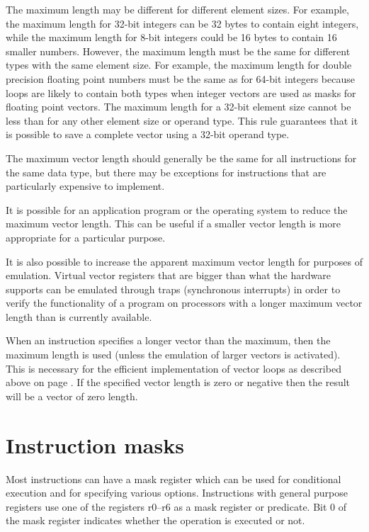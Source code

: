 \documentclass[forwardcom.tex]{subfiles}
\begin{document}
The maximum length may be different for different element sizes. For example, the maximum length for 32-bit integers can be 32 bytes to contain eight integers, while the maximum length for 8-bit integers could be 16 bytes to contain 16 smaller numbers. However, the maximum length must be the same for different types with the same element size. For example, the maximum length for double precision floating point numbers must be the same as for 64-bit integers because loops are likely to contain both types when integer vectors are used as masks for floating point vectors. The maximum length for a 32-bit element size cannot be less than for any other element size or operand type. This rule guarantees that it is possible to save a complete vector using a 32-bit operand type.
\vspace{2mm}

The maximum vector length should generally be the same for all instructions for the same data type, but there may be exceptions for instructions that are particularly expensive to implement. 
\vspace{2mm}

It is possible for an application program or the operating system to reduce the maximum vector length. This can be useful if a smaller vector length is more appropriate for a particular purpose.
\vspace{2mm}

It is also possible to increase the apparent maximum vector length for purposes of emulation. Virtual vector registers that are bigger than what the hardware supports can be emulated through traps (synchronous interrupts) in order to verify the functionality of a program on processors with a longer maximum vector length than is currently available.
\vspace{2mm}

When an instruction specifies a longer vector than the maximum, then the maximum length is used (unless the emulation of larger vectors is activated). This is necessary for the efficient implementation of vector loops as described above on page \pageref{vectorLoops}.
If the specified vector length is zero or negative then the result will be a vector of zero length.

\section{Instruction masks}
Most instructions can have a mask register which can be used for conditional execution and for specifying various options. Instructions with general purpose registers use one of the registers r0--r6 as a mask register or predicate. Bit 0 of the mask register indicates whether the operation is executed or not.
\vspace{2mm}
\end{document}
